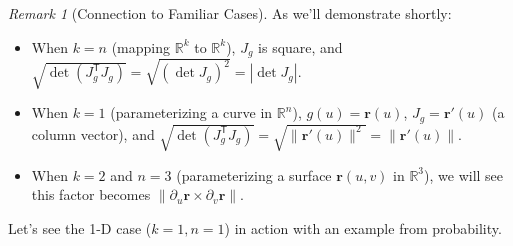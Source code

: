 \documentclass[12pt]{article}
\theoremstyle{definition} %
\theoremstyle{plain} %
\theoremstyle{remark} %
\newtheorem{remark}[definition]{Remark}
\begin{document}
\begin{remark}[Connection to Familiar Cases]
As we'll demonstrate shortly:
\begin{itemize}
    \item When $k=n$ (mapping $\mathbb{R}^k$ to $\mathbb{R}^k$), $J_g$ is square, and $\sqrt{\det(J_g^{\mathsf{T}} J_g)} = \sqrt{(\det J_g)^2} = |\det J_g|$.
    \item When $k=1$ (parameterizing a curve in $\mathbb{R}^n$), $g(u) = \mathbf{r}(u)$, $J_g = \mathbf{r}'(u)$ (a column vector), and $\sqrt{\det(J_g^{\mathsf{T}} J_g)} = \sqrt{\|\mathbf{r}'(u)\|^2} = \|\mathbf{r}'(u)\|$.
    \item When $k=2$ and $n=3$ (parameterizing a surface $\mathbf{r}(u,v)$ in $\mathbb{R}^3$), we will see this factor becomes $\|\partial_u \mathbf{r} \times \partial_v \mathbf{r}\|$.
\end{itemize}
\end{remark}

Let's see the 1-D case ($k=1, n=1$) in action with an example from probability.
\end{document}
